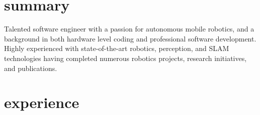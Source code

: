 \documentclass[stdletter]{friggeri-cv} %
\begin{document}
%    
%    

\section{summary}
Talented software engineer with a passion for autonomous mobile robotics, and a background in both hardware level coding and professional software development. Highly experienced with state-of-the-art robotics, perception, and SLAM technologies having completed numerous robotics projects, research initiatives, and publications.


\section{experience}
\end{document}
